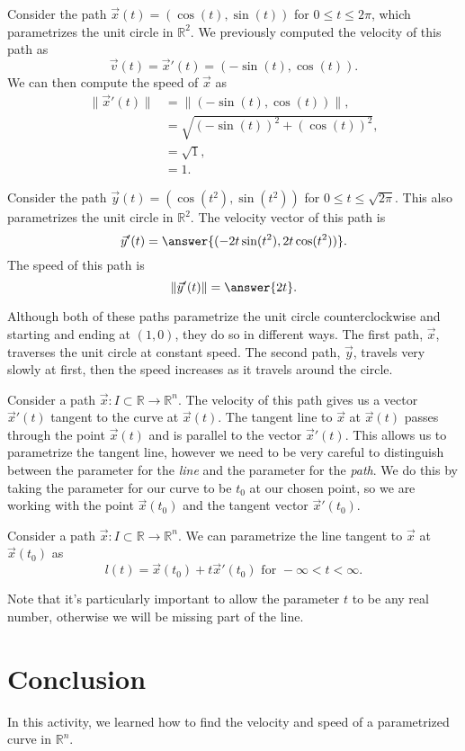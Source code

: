 \documentclass{ximera}
\begin{document}
\begin{example}
Consider the path $\vec{x}(t) = (\cos(t), \sin(t))$ for $0\leq t \leq 2\pi$, which parametrizes the unit circle in $\mathbb{R}^2$. We previously computed the velocity of this path as
\[
\vec{v}(t) = \vec{x}'(t) = (-\sin(t), \cos(t)).
\]
We can then compute the speed of $\vec{x}$ as
\begin{align*}
\|\vec{x}'(t)\| &= \|(-\sin(t), \cos(t))\|,\\
&= \sqrt{(-\sin(t))^2 + (\cos(t))^2},\\
& = \sqrt{1},\\
& = 1.
\end{align*}

Consider the path $\vec{y}(t) = (\cos(t^2), \sin(t^2))$ for $0\leq t\leq \sqrt{2\pi}$. This also parametrizes the unit circle in $\mathbb{R}^2$. The velocity vector of this path is
\[
\vec{y}'(t) = \answer{(-2t\sin(t^2), 2t\cos(t^2))}.
\]
The speed of this path is
\[
\|\vec{y}'(t)\| = \answer{2t}.
\]

Although both of these paths parametrize the unit circle counterclockwise and starting and ending at $(1,0)$, they do so in different ways. The first path, $\vec{x}$, traverses the unit circle at constant speed. The second path, $\vec{y}$, travels very slowly at first, then the speed increases as it travels around the circle.
\end{example}

Consider a path $\vec{x}:I\subset\mathbb{R}\rightarrow\mathbb{R}^n$. The velocity of this path gives us a vector $\vec{x}'(t)$ tangent to the curve at $\vec{x}(t)$. The tangent line to $\vec{x}$ at $\vec{x}(t)$ passes through the point $\vec{x}(t)$ and is parallel to the vector $\vec{x}'(t)$. This allows us to parametrize the tangent line, however we need to be very careful to distinguish between the parameter for the \emph{line} and the parameter for the \emph{path}. We do this by taking the parameter for our curve to be $t_0$ at our chosen point, so we are working with the point $\vec{x}(t_0)$ and the tangent vector $\vec{x}'(t_0)$.

\begin{proposition}
Consider a path $\vec{x}:I\subset\mathbb{R}\rightarrow\mathbb{R}^n$. We can parametrize the line tangent to $\vec{x}$ at $\vec{x}(t_0)$ as
\[
l(t) = \vec{x}(t_0) + t\vec{x}'(t_0) \textrm{ for } -\infty < t < \infty.
\]
\end{proposition}

Note that it's particularly important to allow the parameter $t$ to be any real number, otherwise we will be missing part of the line.

\section{Conclusion}

In this activity, we learned how to find the velocity and speed of a parametrized curve in $\mathbb{R}^n$.
\end{document}
